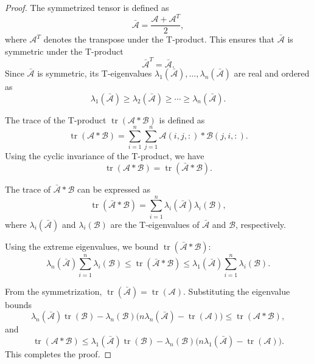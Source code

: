 \documentclass[oupthm]{CUP-JNL-BCM}%
\theoremstyle{oupplain}
\theoremstyle{oupdefinition}
\theoremstyle{oupremark}
\theoremstyle{oupproof}
\newtheorem{proof}{Proof}
\numberwithin{equation}{section}
\begin{document}
\begin{proof}
    The symmetrized tensor is defined as
    \[
    \bar{\mathcal{A}} = \frac{\mathcal{A} + \mathcal{A}^T}{2},
    \]
    where $\mathcal{A}^T$ denotes the transpose under the T-product. This ensures that $\bar{\mathcal{A}}$ is symmetric under the T-product
    \[
    \bar{\mathcal{A}}^T = \bar{\mathcal{A}}.
    \]
    Since $\bar{\mathcal{A}}$ is symmetric, its T-eigenvalues $\lambda_1(\bar{\mathcal{A}}), \dots, \lambda_n(\bar{\mathcal{A}})$ are real and ordered as
    \[
    \lambda_1(\bar{\mathcal{A}}) \geq \lambda_2(\bar{\mathcal{A}}) \geq \cdots \geq \lambda_n(\bar{\mathcal{A}}).
    \]

    \noindent The trace of the T-product $\operatorname{tr}(\mathcal{A} * \mathcal{B})$ is defined as
    \[
    \operatorname{tr}(\mathcal{A} * \mathcal{B}) = \sum_{i=1}^n \sum_{j=1}^n \mathcal{A}(i, j, :) * \mathcal{B}(j, i, :).
    \]
    Using the cyclic invariance of the T-product, we have
    \[
    \operatorname{tr}(\mathcal{A} * \mathcal{B}) = \operatorname{tr}(\bar{\mathcal{A}} * \mathcal{B}).
    \]

   \noindent The trace of $\bar{\mathcal{A}} * \mathcal{B}$ can be expressed as
    \[
    \operatorname{tr}(\bar{\mathcal{A}} * \mathcal{B}) = \sum_{i=1}^n \lambda_i(\bar{\mathcal{A}}) \lambda_i(\mathcal{B}),
    \]
    where $\lambda_i(\bar{\mathcal{A}})$ and $\lambda_i(\mathcal{B})$ are the T-eigenvalues of $\bar{\mathcal{A}}$ and $\mathcal{B}$, respectively.

    \noindent Using the extreme eigenvalues, we bound $\operatorname{tr}(\bar{\mathcal{A}} * \mathcal{B})$:
    \[
    \lambda_n(\bar{\mathcal{A}}) \sum_{i=1}^n \lambda_i(\mathcal{B}) \leq \operatorname{tr}(\bar{\mathcal{A}} * \mathcal{B}) \leq \lambda_1(\bar{\mathcal{A}}) \sum_{i=1}^n \lambda_i(\mathcal{B}).
    \]

 \noindent   From the symmetrization, $\operatorname{tr}(\bar{\mathcal{A}}) = \operatorname{tr}(\mathcal{A})$. Substituting the eigenvalue bounds
    \[
    \lambda_n(\bar{\mathcal{A}}) \operatorname{tr}(\mathcal{B}) - \lambda_n(\mathcal{B}) \big(n \lambda_n(\bar{\mathcal{A}}) - \operatorname{tr}(\mathcal{A})\big) \leq \operatorname{tr}(\mathcal{A} * \mathcal{B}),
    \]
    and
    \[
    \operatorname{tr}(\mathcal{A} * \mathcal{B}) \leq \lambda_1(\bar{\mathcal{A}}) \operatorname{tr}(\mathcal{B}) - \lambda_n(\mathcal{B}) \big(n \lambda_1(\bar{\mathcal{A}}) - \operatorname{tr}(\mathcal{A})\big).
    \]
    This completes the proof.
\end{proof}
\end{document}
